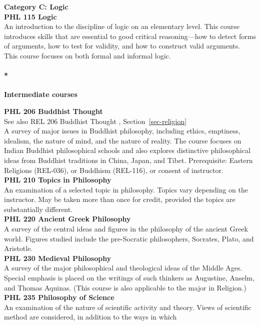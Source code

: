 \documentclass[
  letterpaper,
]{scrbook}
\let\oldparagraph\paragraph
\renewcommand{\paragraph}[1]{\oldparagraph{#1}\mbox{}}
\begin{document}
\textbf{Category C: Logic}\\
\textbf{PHL 115 Logic}\\
An introduction to the discipline of logic on an elementary level. This
course introduces skills that are essential to good critical
reasoning---how to detect forms of arguments, how to test for validity,
and how to construct valid arguments. This course focuses on both formal
and informal logic.

\paragraph*{\texorpdfstring{\textbf{Intermediate
courses}}{Intermediate courses}}\label{intermediate-courses}

\textbf{PHL 206 Buddhist Thought}\\
See also REL 206 Buddhist Thought , Section~\ref{sec-religion}\\
A survey of major issues in Buddhist philosophy, including ethics,
emptiness, idealism, the nature of mind, and the nature of reality. The
course focuses on Indian Buddhist philosophical schools and also
explores distinctive philosophical ideas from Buddhist traditions in
China, Japan, and Tibet. Prerequisite: Eastern Religions (REL-036), or
Buddhism (REL-116), or consent of instructor.\\
\textbf{PHL 210 Topics in Philosophy}\\
An examination of a selected topic in philosophy. Topics vary depending
on the instructor. May be taken more than once for credit, provided the
topics are substantially different.\\
\textbf{PHL 220 Ancient Greek Philosophy}\\
A survey of the central ideas and figures in the philosophy of the
ancient Greek world. Figures studied include the pre-Socratic
philosophers, Socrates, Plato, and Aristotle.\\
\textbf{PHL 230 Medieval Philosophy}\\
A survey of the major philosophical and theological ideas of the Middle
Ages. Special emphasis is placed on the writings of such thinkers as
Augustine, Anselm, and Thomas Aquinas. (This course is also applicable
to the major in Religion.)\\
\textbf{PHL 235 Philosophy of Science}\\
An examination of the nature of scientific activity and theory. Views of
scientific method are considered, in addition to the ways in which
\end{document}

